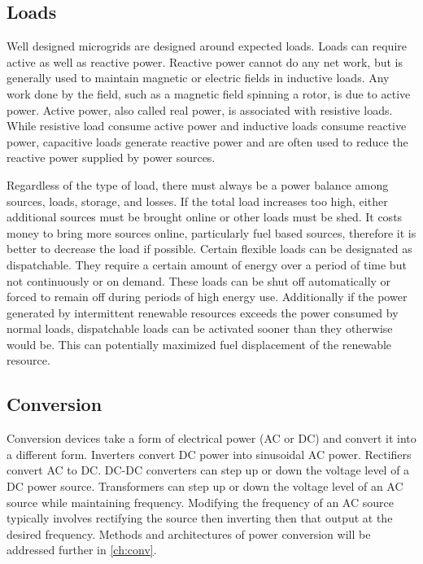 \subsection{Loads}
Well designed microgrids are designed around expected loads. Loads can require active as well as reactive power. Reactive power cannot do any net work, but is generally used to maintain magnetic or electric fields in inductive loads. Any work done by the field, such as a magnetic field spinning a rotor, is due to active power. Active power, also called real power, is associated with resistive loads. While resistive load consume active power and inductive loads consume reactive power, capacitive loads generate reactive power and are often used to reduce the reactive power supplied by power sources. 

Regardless of the type of load, there must always be a power balance among sources, loads, storage, and losses. If the total load increases too high,  either additional sources must be brought online or other loads must be shed. It costs money to bring more sources online, particularly fuel based sources, therefore it is better to decrease the load if possible. Certain flexible loads can be designated as dispatchable. They require a certain amount of energy over a period of time but not continuously or on demand. These loads can be shut off automatically or forced to remain off during periods of high energy use. Additionally if the power generated by intermittent renewable resources exceeds the power consumed by normal loads, dispatchable loads can be activated sooner than they otherwise would be. This can potentially maximized fuel displacement of the renewable resource.  

\subsection{Conversion}
Conversion devices take a form of electrical power (AC or DC) and convert it into a different form. Inverters convert DC power into sinusoidal AC power. Rectifiers convert AC to DC. DC-DC converters can step up or down the voltage level of a DC power source. Transformers can step up or down the voltage level of an AC source while maintaining frequency. Modifying the frequency of an AC source typically involves rectifying the source then inverting then that output at the desired frequency. Methods and architectures of power conversion will be addressed further in \autoref{ch:conv}.

